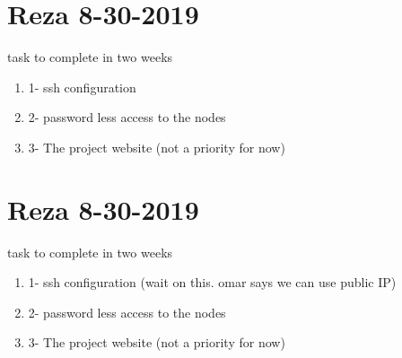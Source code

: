 \section{Reza 8-30-2019}
task to complete in two weeks


\begin{enumerate}
\item 1- ssh configuration 
\item 2- password less access to the nodes 
\item 3- The project website (not a priority for now) 
\end{enumerate}

\section{Reza 8-30-2019}
task to complete in two weeks


\begin{enumerate}
	\item 1- ssh configuration (wait on this. omar says we can use public IP) 
\item 2- password less access to the nodes 
\item 3- The project website (not a priority for now) 
\end{enumerate}

